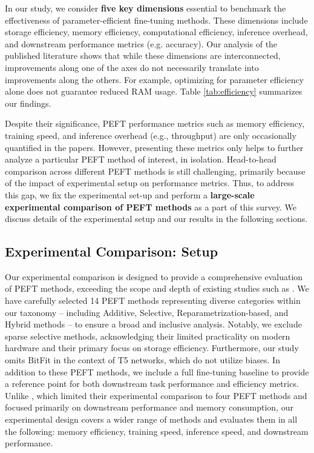 In our study, we consider \textbf{five key dimensions} essential to benchmark the effectiveness of parameter-efficient fine-tuning methods. These dimensions include storage efficiency, memory efficiency, computational efficiency, inference overhead, and downstream performance metrics (e.g. accuracy). Our analysis of the published literature shows that while these dimensions are interconnected, improvements along one of the axes do not necessarily translate into improvements along the others. For example, optimizing for parameter efficiency alone does not guarantee reduced RAM usage. Table \ref{tab:efficiency} summarizes our findings.

Despite their significance, PEFT performance metrics such as memory efficiency, training speed, and inference overhead (e.g., throughput) are only occasionally quantified in the papers. However, presenting these metrics only helps to further analyze a particular PEFT method of interest, in isolation. Head-to-head comparison across different PEFT methods is still challenging, primarily because of the impact of experimental setup on performance metrics. Thus, to address this gap, we fix the experimental set-up and perform a \textbf{large-scale experimental comparison of PEFT methods} as a part of this survey. We discuss details of the experimental setup and our results in the following sections.

\subsection{Experimental Comparison: Setup}
\label{sec:peft_comparison_setup}

Our experimental comparison is designed to provide a comprehensive evaluation of PEFT methods, exceeding the scope and depth of existing studies such as \citet{delta_tuning}. We have carefully selected 14 PEFT methods representing diverse categories within our taxonomy – including Additive, Selective, Reparametrization-based, and Hybrid methods – to ensure a broad and inclusive analysis. Notably, we exclude sparse selective methods, acknowledging their limited practicality on modern hardware and their primary focus on storage efficiency. Furthermore, our study omits BitFit in the context of T5 networks, which do not utilize biases. In addition to these PEFT methods, we include a full fine-tuning baseline to provide a reference point for both downstream task performance and efficiency metrics. Unlike \citet{delta_tuning}, which limited their experimental comparison to four PEFT methods and focused primarily on downstream performance and memory consumption, our experimental design covers a wider range of methods and evaluates them in all the following: memory efficiency, training speed, inference speed, and downstream performance.

